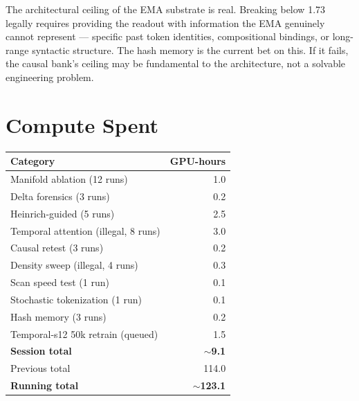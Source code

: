 \documentclass[11pt,a4paper]{report}
\begin{document}
The architectural ceiling of the EMA substrate is real. Breaking below 1.73 legally requires providing the readout with information the EMA genuinely cannot represent --- specific past token identities, compositional bindings, or long-range syntactic structure. The hash memory is the current bet on this. If it fails, the causal bank's ceiling may be fundamental to the architecture, not a solvable engineering problem.

\section{Compute Spent}

\begin{table}[h]
\centering
\begin{tabular}{lr}
\toprule
\textbf{Category} & \textbf{GPU-hours} \\
\midrule
Manifold ablation (12 runs) & 1.0 \\
Delta forensics (3 runs) & 0.2 \\
Heinrich-guided (5 runs) & 2.5 \\
Temporal attention (illegal, 8 runs) & 3.0 \\
Causal retest (3 runs) & 0.2 \\
Density sweep (illegal, 4 runs) & 0.3 \\
Scan speed test (1 run) & 0.1 \\
Stochastic tokenization (1 run) & 0.1 \\
Hash memory (3 runs) & 0.2 \\
Temporal-s12 50k retrain (queued) & 1.5 \\
\midrule
\textbf{Session total} & \textbf{$\sim$9.1} \\
Previous total & 114.0 \\
\textbf{Running total} & \textbf{$\sim$123.1} \\
\bottomrule
\end{tabular}
\end{table}
\end{document}
